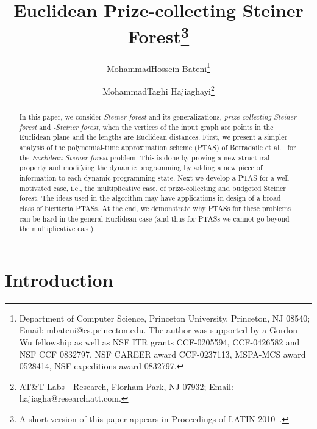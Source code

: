 \documentclass[extras,11pt]{article} \usepackage{fullpage}
\theoremstyle{mytheorem}
\begin{document}
\date{}
\title{Euclidean Prize-collecting Steiner Forest\footnote{A short version of this paper appears in Proceedings of LATIN 2010~\cite{BH10:latin}.}}



\author{MohammadHossein Bateni\thanks{Department of Computer Science, Princeton University, Princeton, NJ 08540; Email: \textsf{mbateni@cs.princeton.edu}.
The author was supported by 
a Gordon Wu fellowship as well as
NSF ITR grants
                      CCF-0205594, CCF-0426582 and NSF CCF 0832797,
                      NSF CAREER award CCF-0237113,
                      MSPA-MCS award 0528414,
                      NSF expeditions award 0832797.}
 \and MohammadTaghi Hajiaghayi\thanks{AT\&T Labs---Research, Florham Park, NJ 07932; Email: \textsf{hajiagha@research.att.com}.}}
\maketitle

\begin{abstract}
In this paper, we consider {\em Steiner forest} and its
generalizations, {\em prize-collecting Steiner forest} and {\em
-Steiner forest}, when the vertices of the input graph are points
in the Euclidean plane and the lengths are Euclidean distances.
First, we present a simpler analysis of the polynomial-time
approximation scheme (PTAS) of Borradaile et
al.~\cite{BKM08:euc-for} for the {\em Euclidean Steiner
forest} problem.
This is done by proving a new structural property and
modifying the dynamic programming by adding a new piece of
information to each dynamic programming state. 
Next we develop a
PTAS for a well-motivated case, i.e., the multiplicative case, of
prize-collecting and budgeted Steiner forest.
The ideas used in the algorithm may have applications in design of a broad class of bicriteria PTASs.
At the end, we
demonstrate why PTASs for these problems can be hard in the general
 Euclidean case (and thus for PTASs we cannot go beyond the multiplicative case).
\end{abstract}
\section{Introduction}
\end{document}
